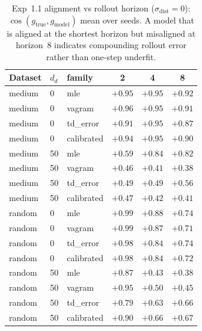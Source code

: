 \begin{table}[htbp]
\centering
\caption{Exp~1.1 alignment vs rollout horizon ($\sigma_{\text{dist}}=0$): $\cos(g_{\text{true}}, g_{\text{model}})$ mean over seeds. A model that is aligned at the shortest horizon but misaligned at horizon~8 indicates compounding rollout error rather than one-step underfit.}
\label{tab:h11horizon}
\begin{tabular}{lllccc}
\toprule
Dataset & $d_d$ & family & 2 & 4 & 8 \\
\midrule
medium & 0 & mle & $+0.95$ & $+0.95$ & $+0.92$ \\
medium & 0 & vagram & $+0.96$ & $+0.95$ & $+0.91$ \\
medium & 0 & td_error & $+0.91$ & $+0.95$ & $+0.87$ \\
medium & 0 & calibrated & $+0.94$ & $+0.95$ & $+0.90$ \\
medium & 50 & mle & $+0.59$ & $+0.84$ & $+0.82$ \\
medium & 50 & vagram & $+0.46$ & $+0.41$ & $+0.38$ \\
medium & 50 & td_error & $+0.49$ & $+0.49$ & $+0.56$ \\
medium & 50 & calibrated & $+0.47$ & $+0.42$ & $+0.41$ \\
random & 0 & mle & $+0.99$ & $+0.88$ & $+0.74$ \\
random & 0 & vagram & $+0.99$ & $+0.87$ & $+0.71$ \\
random & 0 & td_error & $+0.98$ & $+0.84$ & $+0.74$ \\
random & 0 & calibrated & $+0.98$ & $+0.84$ & $+0.72$ \\
random & 50 & mle & $+0.87$ & $+0.43$ & $+0.38$ \\
random & 50 & vagram & $+0.95$ & $+0.50$ & $+0.45$ \\
random & 50 & td_error & $+0.79$ & $+0.63$ & $+0.66$ \\
random & 50 & calibrated & $+0.90$ & $+0.66$ & $+0.67$ \\
\bottomrule
\end{tabular}
\end{table}
